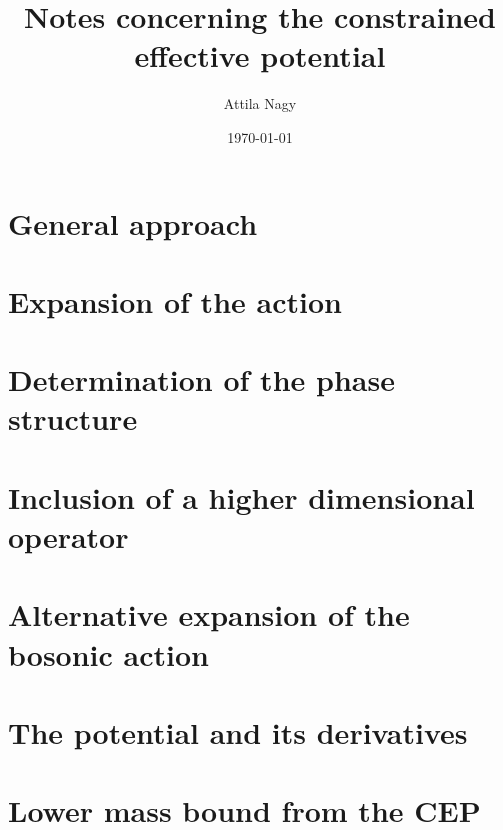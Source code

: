\documentclass[a4paper,10pt,final]{article}
\title{Notes concerning the constrained effective potential}
\author{Attila Nagy}
\date{\today}
\numberwithin{equation}{section} %
\begin{document}
\section{General approach}

%
%
\section{Expansion of the action}

%
\clearpage
%
\section{Determination of the phase structure}

%
\clearpage
%
\section{Inclusion of a higher dimensional operator}

%
\clearpage
%
\section{Alternative expansion of the bosonic action}

%
\clearpage
%
\section{The potential and its derivatives}

%
\clearpage
%
\section{Lower mass bound from the CEP}


% 
% 
%
\end{document}
